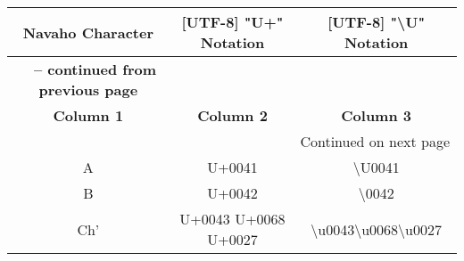 \begin{longtable}{|c|c|c|}
\hline
\textbf{Navaho Character} & \textbf{[UTF-8] "U+" Notation} & \textbf{[UTF-8] "\textbackslash{}U" Notation} \\ \hline
\endfirsthead
{}

\multicolumn{3}{c}%
{{\bfseries \tablename\ \thetable{} -- continued from previous page}} \\
\hline 
\textbf{Column 1} & \textbf{Column 2} & \textbf{Column 3} \\ \hline
\endhead

\hline \multicolumn{3}{|r|}{{Continued on next page}} \\ \hline
\endfoot

\hline
\endlastfoot


A & U+0041 & \textbackslash{}U0041 \\ \hline
B & U+0042 & \textbackslash{}0042 \\ \hline
Ch' & U+0043 U+0068 U+0027 & \textbackslash{}u0043\textbackslash{}u0068\textbackslash{}u0027 \\ \hline

\end{longtable}